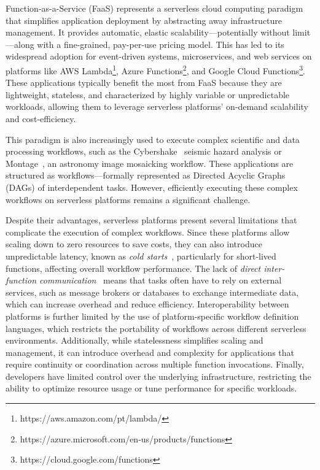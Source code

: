 \documentclass[conference]{IEEEtran}
\begin{document}
Function-as-a-Service (FaaS) represents a serverless cloud computing paradigm that simplifies application deployment by abstracting away infrastructure management. It provides automatic, elastic scalability—potentially without limit—along with a fine-grained, pay-per-use pricing model. This has led to its widespread adoption for event-driven systems, microservices, and web services on platforms like AWS Lambda\footnote{\label{fn:aws-lambda}https://aws.amazon.com/pt/lambda/}, Azure Functions\footnote{\label{fn:azure-funcs}https://azure.microsoft.com/en-us/products/functions}, and Google Cloud Functions\footnote{\label{fn:google-cloud-functions}https://cloud.google.com/functions}. These applications typically benefit the most from FaaS because they are lightweight, stateless, and characterized by highly variable or unpredictable workloads, allowing them to leverage serverless platforms' on-demand scalability and cost-efficiency.

This paradigm is also increasingly used to execute complex scientific and data processing workflows, such as the Cybershake~\cite{cybershake_workflow} seismic hazard analysis or Montage~\cite{montage_astronomy}, an astronomy image mosaicking workflow. These applications are structured as workflows—formally represented as Directed Acyclic Graphs (DAGs) of interdependent tasks. However, efficiently executing these complex workflows on serverless platforms remains a significant challenge. 

Despite their advantages, serverless platforms present several limitations that complicate the execution of complex workflows. Since these platforms allow scaling down to zero resources to save costs, they can also introduce unpredictable latency, known as \textit{cold starts}~\cite{cold_starts_surey}, particularly for short-lived functions, affecting overall workflow performance. The lack of \textit{direct inter-function communication}~\cite{serverless_computing_drawbacks_survey_rw1} means that tasks often have to rely on external services, such as message brokers or databases to exchange intermediate data, which can increase overhead and reduce efficiency. Interoperability between platforms is further limited by the use of platform-specific workflow definition languages, which restricts the portability of workflows across different serverless environments. Additionally, while statelessness simplifies scaling and management, it can introduce overhead and complexity for applications that require continuity or coordination across multiple function invocations. Finally, developers have limited control over the underlying infrastructure, restricting the ability to optimize resource usage or tune performance for specific workloads.
\end{document}
